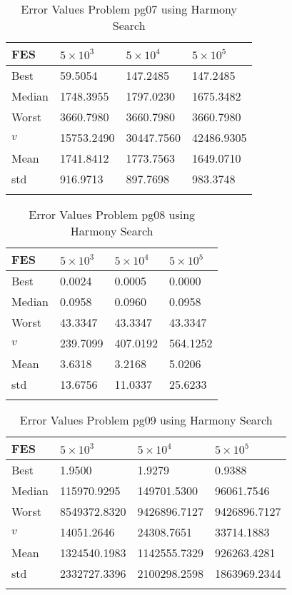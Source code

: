 \documentclass[10pt, a4paper]{book}
\begin{document}
\begin{center}
\begin{longtable}{l l l l}
FES & $5 \times 10^{3}$ & $5 \times 10^{4}$ & $5 \times 10^{5}$ \\
\hline
Best & 59.5054 & 147.2485 & 147.2485 \\
Median & 1748.3955 & 1797.0230 & 1675.3482 \\
Worst & 3660.7980 & 3660.7980 & 3660.7980 \\
$v$ & 15753.2490 & 30447.7560 & 42486.9305 \\
Mean & 1741.8412 & 1773.7563 & 1649.0710 \\
std & 916.9713 & 897.7698 & 983.3748 \\
\caption{ Error Values Problem pg07 using Harmony Search }
\end{longtable}
\end{center}

\begin{center}
\begin{longtable}{l l l l}
FES & $5 \times 10^{3}$ & $5 \times 10^{4}$ & $5 \times 10^{5}$ \\
\hline
Best & 0.0024 & 0.0005 & 0.0000 \\
Median & 0.0958 & 0.0960 & 0.0958 \\
Worst & 43.3347 & 43.3347 & 43.3347 \\
$v$ & 239.7099 & 407.0192 & 564.1252 \\
Mean & 3.6318 & 3.2168 & 5.0206 \\
std & 13.6756 & 11.0337 & 25.6233 \\
\caption{ Error Values Problem pg08 using Harmony Search }
\end{longtable}
\end{center}

\begin{center}
\begin{longtable}{l l l l}
FES & $5 \times 10^{3}$ & $5 \times 10^{4}$ & $5 \times 10^{5}$ \\
\hline
Best & 1.9500 & 1.9279 & 0.9388 \\
Median & 115970.9295 & 149701.5300 & 96061.7546 \\
Worst & 8549372.8320 & 9426896.7127 & 9426896.7127 \\
$v$ & 14051.2646 & 24308.7651 & 33714.1883 \\
Mean & 1324540.1983 & 1142555.7329 & 926263.4281 \\
std & 2332727.3396 & 2100298.2598 & 1863969.2344 \\
\caption{ Error Values Problem pg09 using Harmony Search }
\end{longtable}
\end{center}
\end{document}

